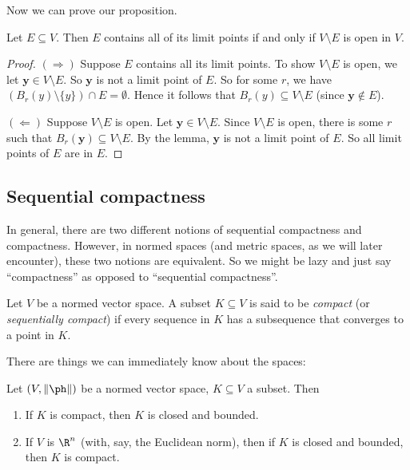 \documentclass[a4paper]{article}
\begin{document}
Now we can prove our proposition.
\begin{prop}
  Let $E\subseteq V$. Then $E$ contains all of its limit points if and only if $V\setminus E$ is open in $V$.
\end{prop}

\begin{proof}
  $(\Rightarrow)$ Suppose $E$ contains all its limit points. To show $V\setminus E$ is open, we let $\mathbf{y} \in V\setminus E$. So $\mathbf{y}$ is not a limit point of $E$. So for some $r$, we have $(B_r(y)\setminus \{y\}) \cap E = \emptyset$. Hence it follows that $B_r(y) \subseteq V\setminus E$ (since $\mathbf{y} \not\in E$).

  $(\Leftarrow)$ Suppose $V\setminus E$ is open. Let $\mathbf{y} \in V\setminus E$. Since $V\setminus E$ is open, there is some $r$ such that $B_r(\mathbf{y}) \subseteq V\setminus E$. By the lemma, $\mathbf{y}$ is not a limit point of $E$. So all limit points of $E$ are in $E$.
\end{proof}

\subsection{Sequential compactness}
In general, there are two different notions of sequential compactness and compactness. However, in normed spaces (and metric spaces, as we will later encounter), these two notions are equivalent. So we might be lazy and just say ``compactness'' as opposed to ``sequential compactness''.

\begin{defi}
  Let $V$ be a normed vector space. A subset $K\subseteq V$ is said to be \emph{compact} (or \emph{sequentially compact}) if every sequence in $K$ has a subsequence that converges to a point in $K$.
\end{defi}

There are things we can immediately know about the spaces:
\begin{thm}[]
  Let $(V, \|\ph\|)$ be a normed vector space, $K\subseteq V$ a subset. Then
  \begin{enumerate}
    \item If $K$ is compact, then $K$ is closed and bounded.
    \item If $V$ is $\R^n$ (with, say, the Euclidean norm), then if $K$ is closed and bounded, then $K$ is compact.
  \end{enumerate}
\end{thm}
\end{document}
